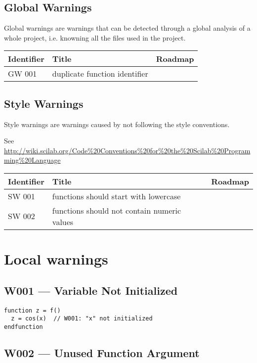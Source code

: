 \documentclass{article}
\begin{document}
\subsection{Global Warnings}

Global warnings are warnings that can be detected through a global
analysis of a whole project, i.e. knowning all the files used in the
project.

\begin{tabular}{|l|l|l|} \hline
Identifier & Title & Roadmap          \\ \hline
GW 001  & duplicate function identifier & \\ \hline
\end{tabular}

\subsection{Style Warnings}

Style warnings are warnings caused by not following the style
conventions.

See \url{http://wiki.scilab.org/Code%20Conventions%20for%20the%20Scilab%20Programming%20Language}

\begin{tabular}{|l|l|l|} \hline
Identifier & Title & Roadmap          \\ \hline
SW 001  & functions should start with lowercase & \\ \hline
SW 002  & functions should not contain numeric values & \\ \hline
\end{tabular}

\section{Local warnings}

\subsection{W001 --- Variable Not Initialized}

\begin{verbatim}
function z = f()
  z = cos(x)  // W001: "x" not initialized
endfunction
\end{verbatim}

\subsection{W002 --- Unused Function Argument}
\end{document}
